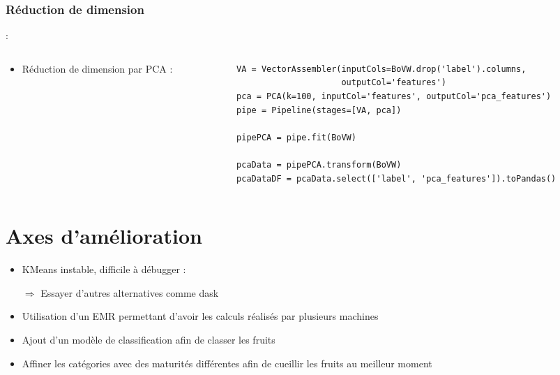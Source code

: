 \documentclass[8pt,aspectratio=169,hyperref={unicode=true}]{beamer}
\begin{document}
\subsubsection{Réduction de dimension}
\begin{frame}[fragile]{\insertsubsection : \insertsubsubsection}
  \begin{columns}
    \begin{column}{.25\textwidth}
      \begin{itemize}
        \item Réduction de dimension par PCA :
      \end{itemize}
    \end{column}
    \begin{column}{.75\textwidth}
      \begin{verbatim}
VA = VectorAssembler(inputCols=BoVW.drop('label').columns,
                     outputCol='features')
pca = PCA(k=100, inputCol='features', outputCol='pca_features')
pipe = Pipeline(stages=[VA, pca])

pipePCA = pipe.fit(BoVW)

pcaData = pipePCA.transform(BoVW)
pcaDataDF = pcaData.select(['label', 'pca_features']).toPandas()
      \end{verbatim}
    \end{column}
  \end{columns}
\end{frame}

\section{Axes d'amélioration}
\begin{frame}{\insertsection}
  \begin{itemize}
    \item KMeans instable, difficile à débugger :
    \item[$\Rightarrow$] Essayer d'autres alternatives comme dask
    \item[]
    \item Utilisation d'un EMR permettant d'avoir les calculs réalisés par plusieurs machines
    \item[]
    \item Ajout d'un modèle de classification afin de classer les fruits
    \item[]
    \item Affiner les catégories avec des maturités différentes afin de cueillir les fruits au meilleur moment
  \end{itemize}
\end{frame}
\end{document}
